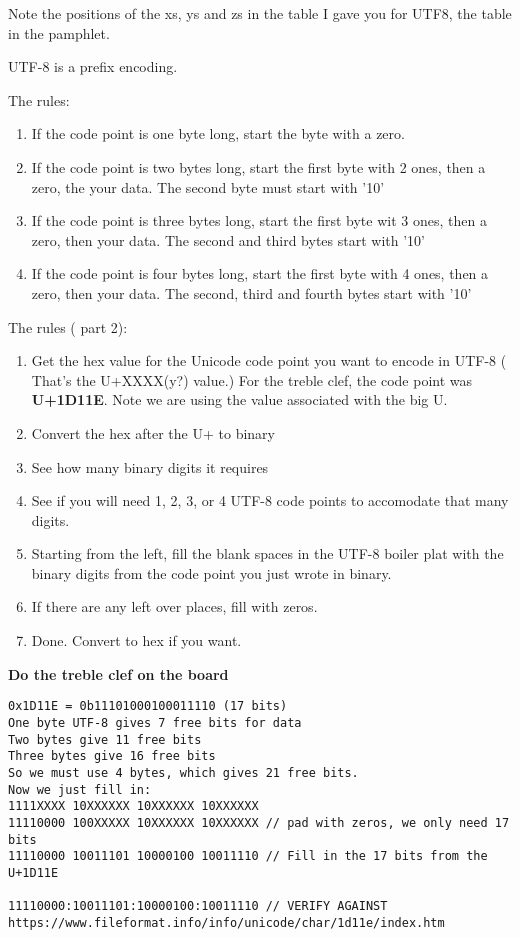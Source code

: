 \documentclass[12pt]{article}
\begin{document}
Note the positions of the xs, ys and zs in the table I gave you for UTF8, the table in the pamphlet.

UTF-8 is a prefix encoding. 

The rules:
\begin{enumerate}
\item If the code point is one byte long, start the byte with a zero.
\item If the code point is two bytes long, start the first byte with 2 ones, then a zero, the your data. The second byte must start with '10'
\item If the code point is three bytes long, start the first byte wit 3 ones, then a zero, then your data. The second and third bytes start with '10'
\item If the code point is four bytes long, start the first byte with 4 ones, then a zero, then your data. The second, third and fourth bytes start with '10'
\end{enumerate}

The rules ( part 2):
\begin{enumerate}
\item Get the hex value for the Unicode code point you want to encode in UTF-8 ( That's the U+XXXX(y?) value.)
For the treble clef, the code point was \textbf{U+1D11E}. Note we are using the value associated with the big U.
\item Convert the hex after the U+ to binary
\item See how many binary digits it requires
\item See if you will need 1, 2, 3, or 4 UTF-8 code points to accomodate that many digits. 
\item Starting from the left, fill the blank spaces in the UTF-8 boiler plat with the binary digits from the code point you just wrote in binary.
\item If there are any left over places, fill with zeros.
\item Done. Convert to hex if you want.
\end{enumerate}

\begin{center}
\textbf{Do the treble clef on the board}
\end{center}

\begin{lstlisting}
0x1D11E = 0b11101000100011110 (17 bits)
One byte UTF-8 gives 7 free bits for data
Two bytes give 11 free bits
Three bytes give 16 free bits
So we must use 4 bytes, which gives 21 free bits.
Now we just fill in:
1111XXXX 10XXXXXX 10XXXXXX 10XXXXXX
11110000 100XXXXX 10XXXXXX 10XXXXXX // pad with zeros, we only need 17 bits
11110000 10011101 10000100 10011110 // Fill in the 17 bits from the U+1D11E

11110000:10011101:10000100:10011110 // VERIFY AGAINST https://www.fileformat.info/info/unicode/char/1d11e/index.htm
\end{lstlisting}
\end{document}
